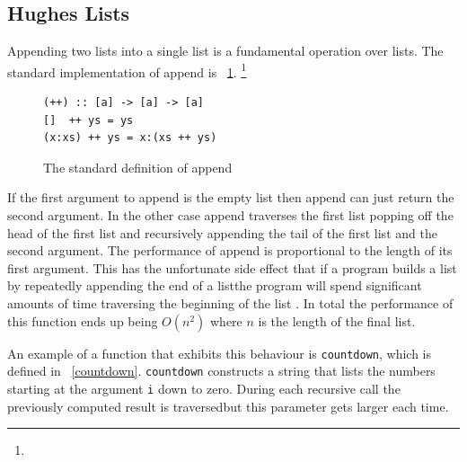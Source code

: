 \subsection{Hughes Lists}

Appending two lists into a single list is a fundamental operation over lists. The standard implementation of append is \DIFdelbegin {}\DIFdelend \DIFaddbegin {}\DIFaddend ~\ref{append}.
\DIFdelbegin \footnote{\texttt{\DIFdel{(++)}} %
} 
\addtocounter{footnote}{-1}%
\DIFdelend 

\begin{figure}[t]
\begin{lstlisting}
(++) :: [a] -> [a] -> [a]
[]  ++ ys = ys
(x:xs) ++ ys = x:(xs ++ ys)
\end{lstlisting}
\caption{The standard definition of append}
\label{append}
\end{figure}

If the first argument to append is the empty list then append can just return the second argument. In the other case append traverses the first list popping off the head of the first list and recursively appending the tail of the first list and the second argument. The performance of append is \DIFaddbegin {}\DIFaddend proportional to the length of its first argument. This has the unfortunate side effect that if a program builds \DIFdelbegin {}\DIFdelend a list by repeatedly appending \DIFdelbegin {}\DIFdelend \DIFaddbegin {}\DIFaddend the end of a list\DIFaddbegin \DIFadd{, }\DIFaddend the program will spend significant amounts of time traversing the beginning of the list \DIFdelbegin {}\DIFdelend \DIFaddbegin {}\DIFaddend . In total the performance of this function ends up being $O(n^2)$ where $n$ is the length of the final list.

An example of a function that exhibits this behaviour is \texttt{countdown}, which is defined in \DIFdelbegin {}\DIFdelend \DIFaddbegin {}\DIFaddend ~\ref{countdown}. \texttt{countdown} constructs a string that lists the numbers starting at the argument \texttt{i} down to zero. During each recursive call the previously computed result is traversed\DIFaddbegin \DIFadd{, }\DIFaddend but this parameter gets larger each time\DIFdelbegin {}\DIFdelend .

